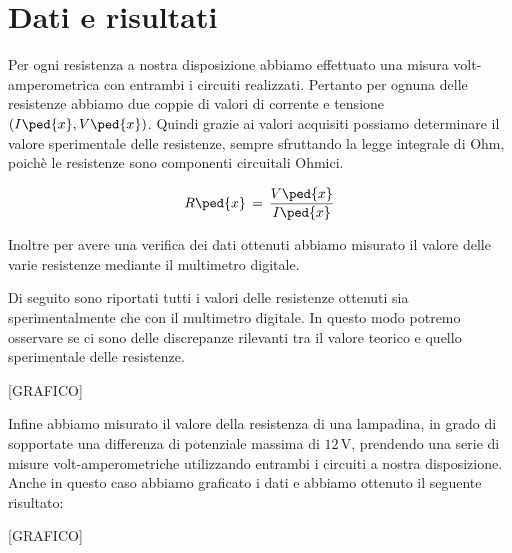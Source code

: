 \section*{Dati e risultati}

Per ogni resistenza a nostra disposizione abbiamo effettuato una misura volt-amperometrica con entrambi i circuiti realizzati. Pertanto per ognuna delle resistenze abbiamo due coppie di valori di corrente e tensione $(I\ped{x}, V\ped{x})$.
Quindi grazie ai valori acquisiti possiamo determinare il valore sperimentale delle resistenze, sempre sfruttando la legge integrale di Ohm, poichè le resistenze sono componenti circuitali Ohmici.

\begin{equation}
	R\ped{x} \,=\, \frac{V\ped{x}}{I\ped{x}}
\end{equation}

Inoltre per avere una verifica dei dati ottenuti abbiamo misurato il valore delle varie resistenze mediante il multimetro digitale.

Di seguito sono riportati tutti i valori delle resistenze ottenuti sia sperimentalmente  che con il multimetro digitale. In questo modo potremo osservare se ci sono delle discrepanze rilevanti tra il valore teorico e quello sperimentale delle resistenze. 

[GRAFICO]

Infine abbiamo misurato il valore della resistenza di una lampadina, in grado di sopportate una differenza di potenziale massima di $12\,\si{\volt}$, prendendo una serie di misure volt-amperometriche utilizzando entrambi i circuiti a nostra disposizione.
Anche in questo caso abbiamo graficato i dati e abbiamo ottenuto il seguente risultato:

[GRAFICO]
